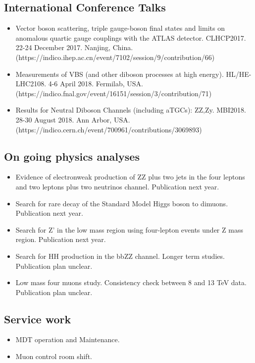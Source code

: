 \subsection{International Conference Talks}
\begin{itemize}
  \item Vector boson scattering, triple gauge-boson final states and limits on anomalous quartic gauge couplings with the ATLAS detector.
        CLHCP2017. 22-24 December 2017. Nanjing, China.
        \\
        (https://indico.ihep.ac.cn/event/7102/session/9/contribution/66)
  \item Measurements of VBS (and other diboson processes at high energy).
        HL/HE-LHC2108. 4-6 April 2018. Fermilab, USA.
        \\
        (https://indico.fnal.gov/event/16151/session/3/contribution/71)
  \item Results for Neutral Diboson Channels (including aTGCs): ZZ,Zy.
        MBI2018. 28-30 August 2018. Ann Arbor, USA.
        \\
        (https://indico.cern.ch/event/700961/contributions/3069893)
\end{itemize}


\subsection{On going physics analyses}
\begin{itemize}
  \item Evidence of electronweak production of ZZ plus two jets in the four leptons and two leptons plus two neutrinos channel. Publication next year.
  \item Search for rare decay of the Standard Model Higgs boson to dimuons. Publication next year.
  \item Search for Z' in the low mass region using four-lepton events under Z mass region. Publication next year.
  \item Search for HH production in the bbZZ channel. Longer term studies. Publication plan unclear.
  \item Low mass four muons study. Consistency check between 8 and 13 TeV data. Publication plan unclear.
\end{itemize}


\subsection{Service work}
\begin{itemize}
  \item MDT operation and Maintenance.
  \item Muon control room shift.
\end{itemize}


